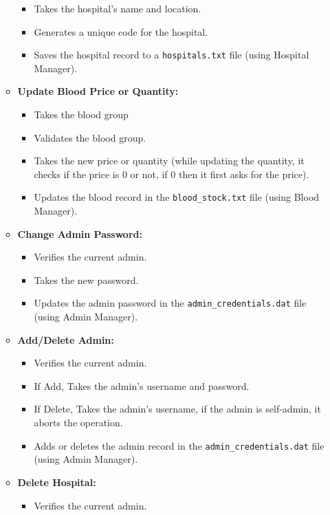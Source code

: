 \documentclass[12pt,a4paper]{report}
\begin{document}
\begin{itemize}
\begin{itemize}
\begin{itemize}
            \item Takes the hospital's name and location.
            \item Generates a unique code for the hospital.
            \item Saves the hospital record to a \texttt{hospitals.txt} file (using Hospital Manager).
        \end{itemize}
        \item \normalsize \textbf{Update Blood Price or Quantity:}
        \begin{itemize}
            \item Takes the blood group
            \item Validates the blood group.
            \item Takes the new price or quantity (while updating the quantity, it checks if the price is 0 or not, if 0 then it first asks for the price).
            \item Updates the blood record in the \texttt{blood\_stock.txt} file (using Blood Manager).
        \end{itemize}
        \item \normalsize \textbf{Change Admin Password:}
        \begin{itemize}
            \item Verifies the current admin.
            \item Takes the new password.
            \item Updates the admin password in the \texttt{admin\_credentials.dat} file (using Admin Manager).
        \end{itemize}
        \item \normalsize \textbf{Add/Delete Admin:}
        \begin{itemize}
            \item Verifies the current admin.
            \item If Add, Takes the admin's username and password.
            \item If Delete, Takes the admin's username, if the admin is self-admin, it aborts the operation.
            \item Adds or deletes the admin record in the \texttt{admin\_credentials.dat} file (using Admin Manager).
        \end{itemize}
        \item \normalsize \textbf{Delete Hospital:}
        \begin{itemize}
            \item Verifies the current admin.

\end{itemize}
\end{itemize}
\end{itemize}
\end{document}
